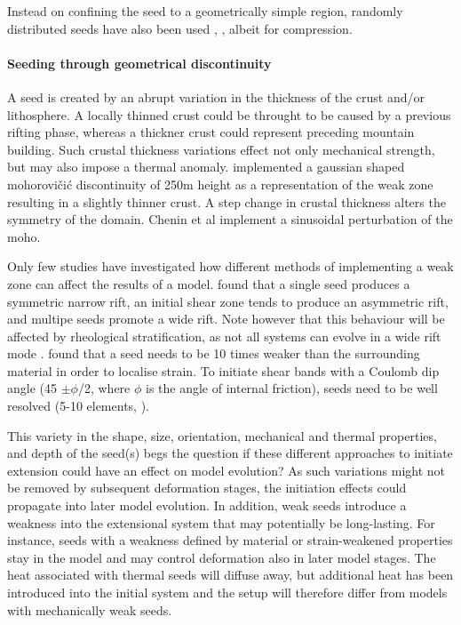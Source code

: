 Instead on confining the seed to a geometrically simple region, randomly distributed seeds 
have also been used \cite{thie11}, \cite{thsh14}, albeit for compression. 

\paragraph{Seeding through geometrical discontinuity} 
A seed is created by an abrupt variation in the thickness of the crust and/or lithosphere.
A locally thinned crust could be throught to be caused by a previous rifting phase,
whereas a thickner crust could represent preceding mountain building.
Such crustal thickness variations effect not only mechanical strength, but may also
impose a thermal anomaly.
\cite{busc08} implemented a gaussian shaped mohorovi\v{c}i\'c discontinuity of 250m 
height as a representation of the weak zone resulting in a slightly thinner crust.
A step change in crustal thickness alters the symmetry of the domain. 
Chenin et al \cite{chsm20} implement a sinusoidal perturbation of the moho.


Only few studies have investigated how different methods of implementing a weak zone 
can affect the results of a model. 
\cite{dyrm07} found that a single seed produces a symmetric narrow rift, an initial shear
zone tends to produce an asymmetric rift, and multipe seeds promote a wide rift. 
Note however that this behaviour will be affected by rheological stratification, as not
all systems can evolve in a wide rift mode \cite{hubb05,buhb08}.
\cite{dyrm07} found that a seed needs to be 10 times weaker than 
the surrounding material in order to localise strain. 
To initiate shear bands with a Coulomb dip angle (45 $\pm\phi$/2, where $\phi$ is the
angle of internal friction), seeds need to be well resolved (5-10 elements, \cite{kaus10}). 

This variety in the shape, size, orientation, mechanical and thermal properties, 
and depth of the seed(s) begs the question if these different approaches to
initiate extension could have an effect on model evolution? 
As such variations might not be
removed by subsequent deformation stages, the initiation effects could propagate into
later model evolution. 
In addition, weak seeds introduce a weakness into the extensional system that may 
potentially be long-lasting. 
For instance, seeds with a weakness defined by material or strain-weakened properties 
stay in the model and may control deformation also in later model stages. 
The heat associated with thermal seeds will diffuse away, but additional 
heat has been introduced into the initial system and the setup will therefore differ from 
models with mechanically weak seeds. 

